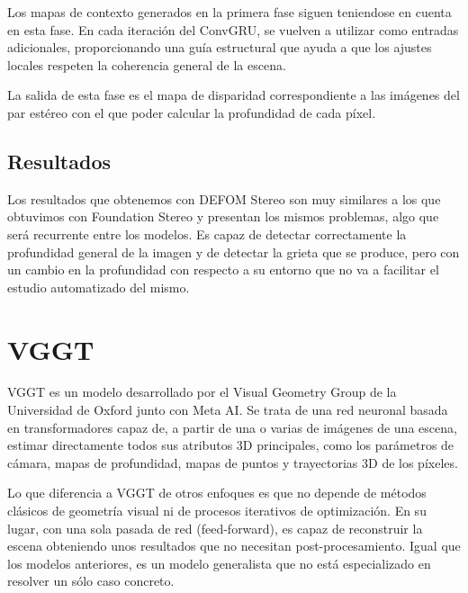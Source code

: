 Los mapas de contexto generados en la primera fase siguen teniendose en cuenta en esta fase. En cada iteración del ConvGRU, se vuelven a utilizar como entradas adicionales, proporcionando una guía estructural que ayuda a que los ajustes locales respeten la coherencia general de la escena.

La salida de esta fase es el mapa de disparidad correspondiente a las imágenes del par estéreo con el que poder calcular la profundidad de cada píxel.

\subsection{Resultados}
Los resultados que obtenemos con DEFOM Stereo son muy similares a los que obtuvimos con Foundation Stereo y presentan los mismos problemas, algo que será recurrente entre los modelos. Es capaz de detectar correctamente la profundidad general de la imagen y de detectar la grieta que se produce, pero con un cambio en la profundidad con respecto a su entorno que no va a facilitar el estudio automatizado del mismo.


\section{VGGT}
VGGT es un modelo desarrollado por el Visual Geometry Group de la Universidad de Oxford junto con Meta AI. Se trata de una red neuronal basada en transformadores capaz de, a partir de una o varias de imágenes de una escena, estimar directamente todos sus atributos 3D principales, como los parámetros de cámara, mapas de profundidad, mapas de puntos y trayectorias 3D de los píxeles.

Lo que diferencia a VGGT de otros enfoques es que no depende de métodos clásicos de geometría visual ni de procesos iterativos de optimización. En su lugar, con una sola pasada de red (feed-forward), es capaz de reconstruir la escena obteniendo unos resultados que no necesitan post-procesamiento. Igual que los modelos anteriores, es un modelo generalista que no está especializado en resolver un sólo caso concreto.


